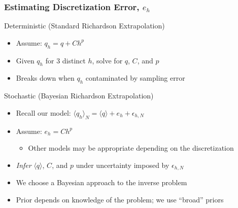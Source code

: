 \documentclass[mathserif]{beamer}
\newcommand{\avg}[1]{\langle #1 \rangle} %
\begin{document}
\begin{frame}
\frametitle{Estimating Discretization Error, $e_h$}

\begin{block}{Deterministic (Standard Richardson Extrapolation)}
\begin{itemize}
\item Assume: $q_h = q + C h^p$
\item Given $q_h$ for 3 distinct $h$, solve for $q$, $C$, and $p$
\item Breaks down when $q_h$ contaminated by sampling error
\end{itemize}
\end{block}

\begin{block}{Stochastic (Bayesian Richardson Extrapolation)}
\begin{itemize}
\item Recall our model: $\langle q_h \rangle_{N} = \langle q \rangle + e_h + \epsilon_{h,N}$
\item Assume: $e_h = C h^p$
  \begin{itemize}
  \item Other models may be appropriate depending on the discretization
  \end{itemize}
 \item \emph{Infer} $\langle q \rangle$, $C$, and $p$ under uncertainty imposed by
      $\epsilon_{h,N}$
 \item We choose a Bayesian approach to the inverse problem
 \item Prior depends on knowledge of the problem; we use ``broad'' priors
\end{itemize}
\end{block}

\end{frame}
\end{document}
